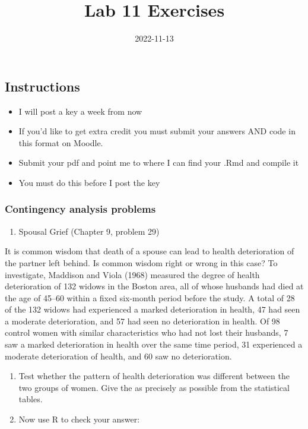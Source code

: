 \documentclass[
]{article}
\title{Lab 11 Exercises}
\author{}
\date{\vspace{-2.5em}2022-11-13}
\providecommand{\tightlist}{%
  \setlength{\itemsep}{0pt}\setlength{\parskip}{0pt}}
\begin{document}
\maketitle

\hypertarget{instructions}{%
\subsection{Instructions}\label{instructions}}

\begin{itemize}
\tightlist
\item
  I will post a key a week from now
\item
  If you'd like to get extra credit you must submit your answers AND
  code in this format on Moodle.
\item
  Submit your pdf and point me to where I can find your .Rmd and compile
  it
\item
  You must do this before I post the key
\end{itemize}

\hypertarget{contingency-analysis-problems}{%
\subsubsection{Contingency analysis
problems}\label{contingency-analysis-problems}}

\begin{enumerate}
\def\labelenumi{\arabic{enumi}.}
\tightlist
\item
  Spousal Grief (Chapter 9, problem 29)
\end{enumerate}

It is common wisdom that death of a spouse can lead to health
deterioration of the partner left behind. Is common wisdom right or
wrong in this case? To investigate, Maddison and Viola (1968) measured
the degree of health deterioration of 132 widows in the Boston area, all
of whose husbands had died at the age of 45--60 within a fixed six-month
period before the study. A total of 28 of the 132 widows had experienced
a marked deterioration in health, 47 had seen a moderate deterioration,
and 57 had seen no deterioration in health. Of 98 control women with
similar characteristics who had not lost their husbands, 7 saw a marked
deterioration in health over the same time period, 31 experienced a
moderate deterioration of health, and 60 saw no deterioration.

\begin{enumerate}
\def\labelenumi{\Alph{enumi})}
\item
  Test whether the pattern of health deterioration was different between
  the two groups of women. Give the as precisely as possible from the
  statistical tables.
\item
  Now use R to check your answer:
\end{enumerate}
\end{document}

